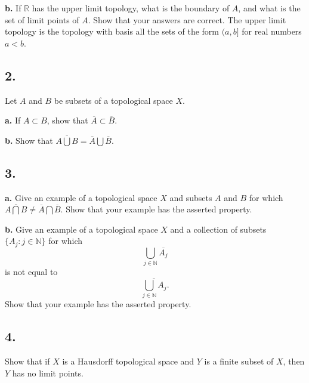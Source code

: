 \documentclass{amsart}
\theoremstyle{plain}
\theoremstyle{definition}
\theoremstyle{remark}
\begin{document}
\vspace{.1in}
{\bfseries b.} If $\mathbb R$ has the upper limit topology, what is the boundary of $A$, and what is the set of limit points of $A$. Show that your answers are correct. The upper limit topology is the topology with basis all the sets of the form $(a,b]$ for real numbers $a<b$. 



\vspace{.15in}

\noindent
\subsection*{2.} Let $A$ and $B$ be subsets of a topological space $X$. 

\vspace{.1in}
{\bfseries a.} If $A\subset B$, show that $\overline{A} \subset \overline{B}$. 

\vspace{.1in}
{\bfseries b.} Show that $\overline{A\bigcup B} = \overline{A} \bigcup \overline{B}$. 



\vspace{.15in}

\noindent
\subsection*{3.} 

\vspace{.1in}
{\bfseries a.} Give an example of a topological space $X$ and subsets $A$ and $B$ for which $\overline{A\bigcap B} \ne \overline{A} \bigcap \overline{B}$. Show that your example has the asserted property. 

\vspace{.1in}
{\bfseries b.} Give an example of a topological space $X$ and a collection of subsets $\{ A_j : j\in \mathbb N \}$ for which 
\[
\bigcup _{j\in \mathbb N } \overline{A_j}
\]
is not equal to 
\[
\overline{\bigcup _{j\in \mathbb N } A_j}.
\]
Show that your example has the asserted property. 

\vspace{.15in}

\noindent
\subsection*{4.}  Show that if $X$ is a Hausdorff topological space and $Y$ is a finite subset of $X$, then $Y$ has no limit points.
\end{document}
